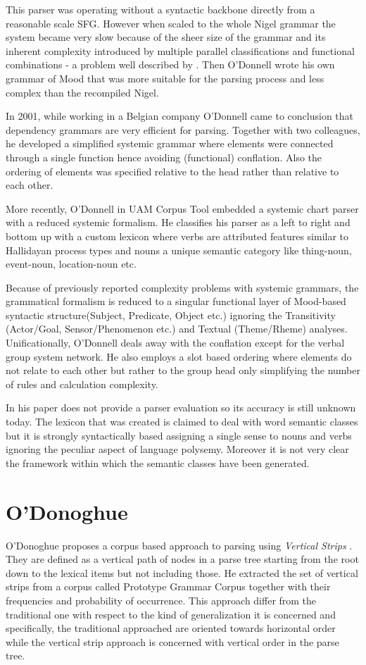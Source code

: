 This parser was operating without a syntactic backbone directly from a reasonable scale SFG. However when scaled to the whole Nigel grammar the system became very slow because of the sheer size of the grammar and its inherent complexity introduced by multiple parallel classifications and functional combinations - a problem well described by \citet{Bateman2008}. Then O'Donnell wrote his own grammar of Mood that was more suitable for the parsing process and less complex than the recompiled Nigel.

In 2001, while working in a Belgian company O'Donnell came to conclusion that dependency grammars are very efficient for parsing. Together with two colleagues, he developed a simplified systemic grammar where elements were connected through a single function hence avoiding (functional) conflation. Also the ordering of elements was specified relative to the head rather than relative to each other.

More recently, O'Donnell in UAM Corpus Tool embedded a systemic chart parser \citep{ODonnell2005a} with a reduced systemic formalism. He classifies his parser as a left to right and bottom up with a custom lexicon where verbs are attributed features similar to Hallidayan process types and nouns a unique semantic category like thing-noun, event-noun, location-noun etc.

Because of previously reported complexity problems \citep{ODonnell1993} with systemic grammars, the grammatical formalism is reduced to a singular functional layer of Mood-based syntactic structure(Subject, Predicate, Object etc.) ignoring the Transitivity (Actor/Goal, Sensor/Phenomenon etc.) and  Textual (Theme/Rheme) analyses. Unificationally, O'Donnell deals away with the conflation except for the verbal group system network. He also employs a slot based ordering where elements do not relate to each other but rather to the group head only simplifying the number of rules and calculation complexity.   

In his paper \citep{ODonnell2005a} does not provide a parser evaluation so its accuracy is still unknown today. The lexicon that was created is claimed to deal with word semantic classes but it is strongly syntactically based assigning a single sense to nouns and verbs ignoring the peculiar aspect of language polysemy. Moreover it is not very clear the framework within which the semantic classes have been generated. 

\section{O'Donoghue}
O'Donoghue proposes a corpus based approach to parsing using \textit{Vertical Strips} \citep{ODonoghue1991a}. They are defined as a vertical path of nodes in a parse tree starting from the root down to the lexical items but not including those. He extracted the set of vertical strips from a corpus called Prototype Grammar Corpus together with their frequencies and probability of occurrence.
This approach differ from the traditional one with respect to the kind of generalization it is concerned and specifically, the traditional approached are oriented towards horizontal order while the vertical strip approach is concerned with vertical order in the parse tree. 


